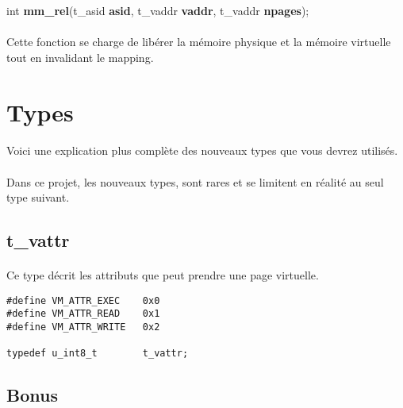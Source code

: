 \documentclass[10pt,a4wide]{article}
\begin{document}
\hspace{1.5cm}int \textbf{mm\_rel}(t\_asid \textbf{asid},
                                   t\_vaddr \textbf{vaddr},
                                   t\_vaddr \textbf{npages});

\paragraph{}

Cette fonction se charge de lib\'erer la m\'emoire physique et la m\'emoire
virtuelle tout en invalidant le mapping.

\section{Types}

\paragraph{}

Voici une explication plus compl\`ete des nouveaux types que
vous devrez utilis\'es.

\paragraph{}

Dans ce projet, les nouveaux types, sont rares et se limitent en r\'ealit\'e
au seul type suivant.

\subsection{t\_vattr}

\paragraph{}

Ce type d\'ecrit les attributs que peut prendre une page virtuelle.

\begin{verbatim}
#define VM_ATTR_EXEC    0x0
#define VM_ATTR_READ    0x1
#define VM_ATTR_WRITE   0x2

typedef u_int8_t        t_vattr;
\end{verbatim}

\subsection{Bonus}
\end{document}
